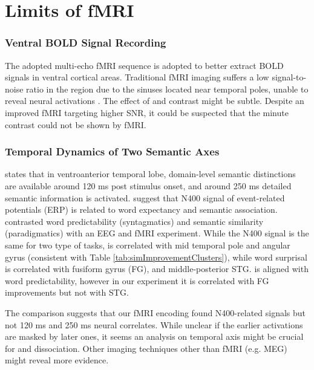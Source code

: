 \section{Limits of fMRI}

\subsubsection{Ventral BOLD Signal Recording}

The adopted multi-echo fMRI sequence is adopted to better extract BOLD signals in ventral cortical areas. Traditional fMRI imaging suffers a low signal-to-noise ratio in the region due to the sinuses located near temporal poles, unable to reveal neural activations \parencite{devlinSusceptibilityInducedLossSignal2000}. The effect of \similarity and \association contrast might be subtle. Despite an improved fMRI targeting higher SNR, it could be suspected that the minute contrast could not be shown by fMRI.

\subsubsection{Temporal Dynamics of Two Semantic Axes}

\textcite{ralphNeuralComputationalBases2017} states that in ventroanterior temporal lobe, domain-level semantic distinctions are available around 120 ms post stimulus onset, and around 250 ms detailed semantic information is activated. \textcite{kutasBrainPotentialsReading1984} suggest that N400 signal of event-related potentials (ERP) is related to word expectancy and semantic association. \textcite{frankWordPredictabilitySemantic2017} contrasted word predictability (syntagmatics) and semantic similarity (paradigmatics) with an EEG and fMRI experiment. While the N400 signal is the same for two type of tasks, \similarity is correlated with mid temporal pole and angular gyrus (consistent with Table \ref{tab:simImprovementClusters}), while word surprisal is correlated with fusiform gyrus (FG), and middle-posterior STG.  is aligned with word predictability, however in our experiment it is correlated with FG improvements but not with STG.

The comparison suggests that our fMRI encoding found N400-related signals but not 120 ms and 250 ms neural correlates. While unclear if the earlier activations are masked by later ones, it seems an analysis on temporal axis might be crucial for \similarity and \association dissociation. Other imaging techniques other than fMRI (e.g. MEG) might reveal more evidence.

